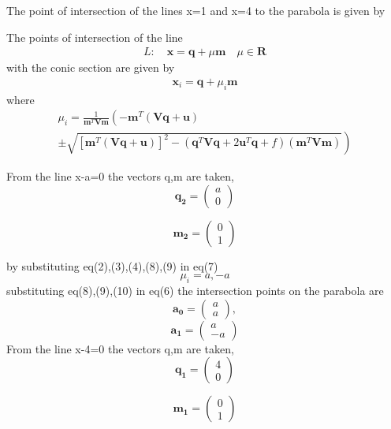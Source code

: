 \documentclass[journal,10pt,twocolumn]{article}
\let\vec\mathbf
\newcommand{\myvec}[1]{\ensuremath{\begin{pmatrix}#1\end{pmatrix}}}
\providecommand{\brak}[1]{\ensuremath{\left(#1\right)}}
\providecommand{\lbrak}[1]{\ensuremath{\left(#1\right.}}
\providecommand{\rbrak}[1]{\ensuremath{\left.#1\right)}}
\providecommand{\sbrak}[1]{\ensuremath{{}\left[#1\right]}}
\begin{document}
The point of intersection of the lines x=1 and x=4 to the parabola is given by



The points of intersection of the line 
\begin{align}
 L: \quad \vec{x} = \vec{q} + \mu \vec{m} \quad \mu \in \mathbf{R}
\label{eq:conic_tangent}
\end{align}
with the conic section are given by
\begin{align}
\vec{x}_i = \vec{q} + \mu_i \vec{m}
\label{eq:conic_tangent_pts}
\end{align}
%
where
{\tiny
\begin{multline}
\mu_i = \frac{1}
{
\vec{m}^T\vec{V}\vec{m}
}
\lbrak{-\vec{m}^T\brak{\vec{V}\vec{q}+\vec{u}}}
\\
\pm
\rbrak{\sqrt{
\sbrak{
\vec{m}^T\brak{\vec{V}\vec{q}+\vec{u}}
}^2
-
\brak
{
\vec{q}^T\vec{V}\vec{q} + 2\vec{u}^T\vec{q} +f
}
\brak{\vec{m}^T\vec{V}\vec{m}}
}
}
\label{eq:tangent_roots}
\end{multline}
}



From the line x-a=0 the vectors q,m are taken,
\begin{equation}
\vec{q_2}=\myvec{a\\0}
\end{equation}

\begin{equation}
\vec{m_2}=\myvec{0\\1}
\end{equation}

by substituting eq(2),(3),(4),(8),(9) in eq(7)
\begin{equation}
\mu_i=a,-a
\end{equation}
substituting eq(8),(9),(10) in eq(6) the intersection points on the parabola are
\begin{equation}
\vec{a_0}=\myvec{a\\a},
\end{equation}
\begin{equation}
\vec{a_1}=\myvec{a\\-a}
\end{equation}
From the line x-4=0 the vectors q,m are taken,
\begin{equation}
\vec{q_1}=\myvec{4\\0}
\end{equation}

\begin{equation}
\vec{m_1}=\myvec{0\\1}
\end{equation}
\end{document}
